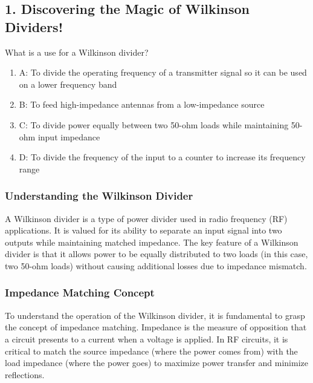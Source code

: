 \subsection{1. Discovering the Magic of Wilkinson Dividers!}

\begin{tcolorbox}[colback=gray!10, colframe=black, title=E9E08] What is a use for a Wilkinson divider?
\begin{enumerate}[label=\Alph*)]
    \item A: To divide the operating frequency of a transmitter signal so it can be used on a lower frequency band
    \item B: To feed high-impedance antennas from a low-impedance source
    \item C: To divide power equally between two 50-ohm loads while maintaining 50-ohm input impedance
    \item D: To divide the frequency of the input to a counter to increase its frequency range
\end{enumerate} \end{tcolorbox}



\subsubsection{Understanding the Wilkinson Divider}

A Wilkinson divider is a type of power divider used in radio frequency (RF) applications. It is valued for its ability to separate an input signal into two outputs while maintaining matched impedance. The key feature of a Wilkinson divider is that it allows power to be equally distributed to two loads (in this case, two 50-ohm loads) without causing additional losses due to impedance mismatch.

\subsubsection{Impedance Matching Concept}

To understand the operation of the Wilkinson divider, it is fundamental to grasp the concept of impedance matching. Impedance is the measure of opposition that a circuit presents to a current when a voltage is applied. In RF circuits, it is critical to match the source impedance (where the power comes from) with the load impedance (where the power goes) to maximize power transfer and minimize reflections.

